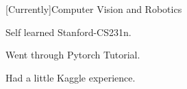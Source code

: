 
\begin{cventries}

  \cventry
    {[Currently]Computer Vision and Robotics} %
    {} %
    {} %
    {} %
    {
      \begin{cvitems} %
        \item {Self learned Stanford-CS231n.}
        \item {Went through Pytorch Tutorial.}
        \item {Had a little Kaggle experience.}
      \end{cvitems}
    }

\end{cventries}
